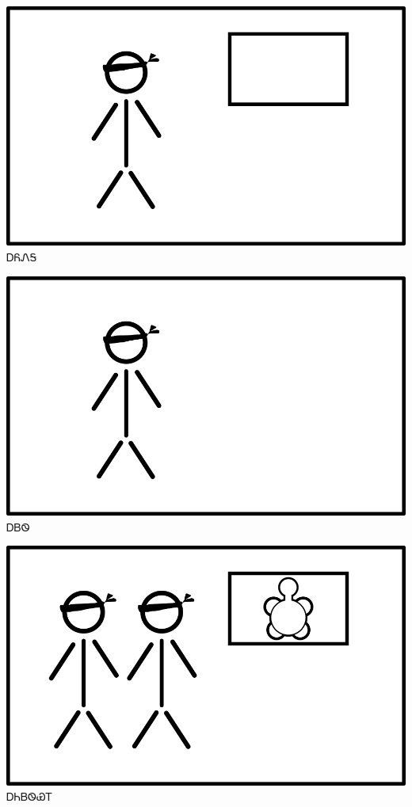\documentclass[avery5371]{flashcards}%
\begin{document}
    \begin{flashcard}{
        \includegraphics[width=0.95\columnwidth,height=.51\columnwidth,keepaspectratio]{../artwork/flags/ayonega-flag-blind}
    }
        \Huge ᎠᏲᏁᎦ
    \end{flashcard}

    \begin{flashcard}{
        \includegraphics[width=0.95\columnwidth,height=.51\columnwidth,keepaspectratio]{../artwork/flags/ayvwi-no-flag-blind}
    }
        \Huge ᎠᏴᏫ
    \end{flashcard}


    \begin{flashcard}{
        \includegraphics[width=0.95\columnwidth,height=.51\columnwidth,keepaspectratio]{../artwork/flags/anidaksi-flag-blind}
    }
        \Huge ᎠᏂᏴᏫᏯᎢ
    \end{flashcard}
\end{document}
